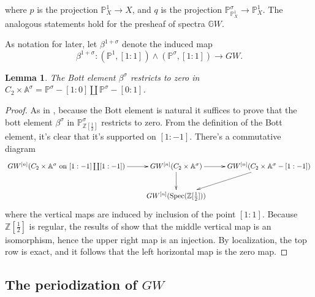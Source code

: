 \documentclass[draftthesis,tocnosub,noragright,centerchapter,10pt]{uiucthesis2009}
\newcommand{\Z}{\mathbb Z}
\newcommand{\mbb}{\mathbb}
\DeclareMathOperator{\Spec}{Spec}
\theoremstyle{plain}
\newtheorem{lemma}{Lemma}
\theoremstyle{definition}
\begin{document}
where $p$ is the projection $\mbb P^1_X \rightarrow X$, and $q$ is the
projection $\mbb P^\sigma_{\mbb P^1_X} \rightarrow \mbb P^1_X$. The
analogous statements hold for the presheaf of spectra $\mbb GW$.

As notation for later, let $\beta^{1+\sigma}$ denote the induced map
\begin{equation}\label{eq:bott_element}
\beta^{1+\sigma} : (\mbb P^1,[1:1]) \wedge (\mbb P^\sigma,[1:1])
\rightarrow GW.
\end{equation}

\begin{lemma}\label{lem:bott_zero}
The Bott element $\beta^\sigma$ restricts to zero in $C_2 \times \mbb
A^\sigma = \mbb P^{\sigma} - [1:0] \coprod \mbb P^\sigma - [0:1]$. 
\end{lemma}

\begin{proof}
As in \cite{Schder}, because the Bott element is natural it suffices
to prove that the bott element $\beta^\sigma$ in $\mbb
P^\sigma_{\Z[\frac{1}{2}]}$ restricts to zero. From the definition of
the Bott element, it's clear that it's supported on $[1:-1]$. There's a commutative diagram
\[
\xymatrix{GW^{[n]}(C_2 \times \mbb A^\sigma \text{ on } [1:-1] \coprod
[1:-1]) \ar[r] & GW^{[n]}(C_2 \times \mbb A^\sigma) \ar[r]\ar[d] &
GW^{[n]}(C_2 \times \mbb A^\sigma - [1:-1]) \ar[dl] \\ &
GW^{[n]}(\Spec(\Z[\frac{1}{2}])) &
} 
\]
where the vertical maps are induced by inclusion of the point
$[1:1]$. Because $\Z[\frac{1}{2}]$ is regular, the results of
\cite{Xie2018ATM} show that the middle vertical map is an isomorphism,
hence the upper right map is an injection. By localization, the top
row is exact, and it follows that the left horizontal map is the zero
map. 
\end{proof}


\subsection{The periodization of $GW$}
\end{document}
